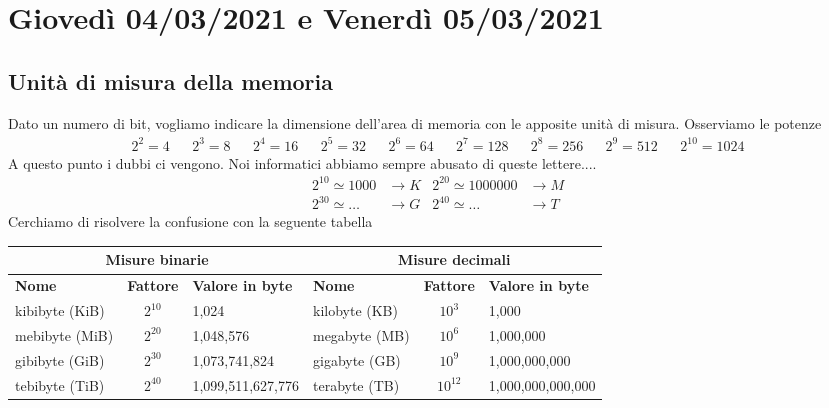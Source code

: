 \chapter{Giovedì 04/03/2021 e Venerdì 05/03/2021}
\section{Unità di misura della memoria} Dato un numero di bit, vogliamo indicare la dimensione dell'area di memoria con le apposite unità di misura. Osserviamo le potenze
\begin{align*}2^2=4&&2^3=8&&2^4=16&&2^5=32&&2^6=64&&2^7=128&&2^8=256&&2^9=512&&\boxed{2^{10}=1024}\end{align*}
A questo punto i dubbi ci vengono. Noi informatici abbiamo sempre abusato di queste lettere....
\begin{align*}
	2^{10}\simeq 1000 &\longrightarrow K&2^{20}\simeq 1000000 &\longrightarrow M\\
	2^{30}\simeq \dots &\longrightarrow G&2^{40}\simeq \dots &\longrightarrow T
\end{align*}
Cerchiamo di risolvere la confusione con la seguente tabella\begin{center}\begin{tabular}{ |l|c|l|l|c|l|} \hline\multicolumn{3}{|c|}{\textbf{Misure binarie}} & \multicolumn{3}{c|}{\textbf{Misure decimali}} \\\hline\textbf{Nome} & \textbf{Fattore} & \textbf{Valore in byte} & \textbf{Nome} & \textbf{Fattore} & \textbf{Valore in byte}\\\hline
		kibibyte (KiB) & $2^{10}$ & 1,024 & kilobyte (KB) & ${10}^3$ & 1,000\\ 
		\hline
		mebibyte (MiB) & $2^{20}$ & 1,048,576 & megabyte (MB) & ${10}^6$  & 1,000,000\\ 
		\hline
		gibibyte (GiB) & $2^{30}$ & 1,073,741,824 & gigabyte (GB) & ${10}^9$  & 1,000,000,000\\ 
		\hline
		tebibyte (TiB) & $2^{40}$ & 1,099,511,627,776 & terabyte (TB) & ${10}^{12}$  & 1,000,000,000,000\\ 
		\hline
	\end{tabular}
\end{center}

